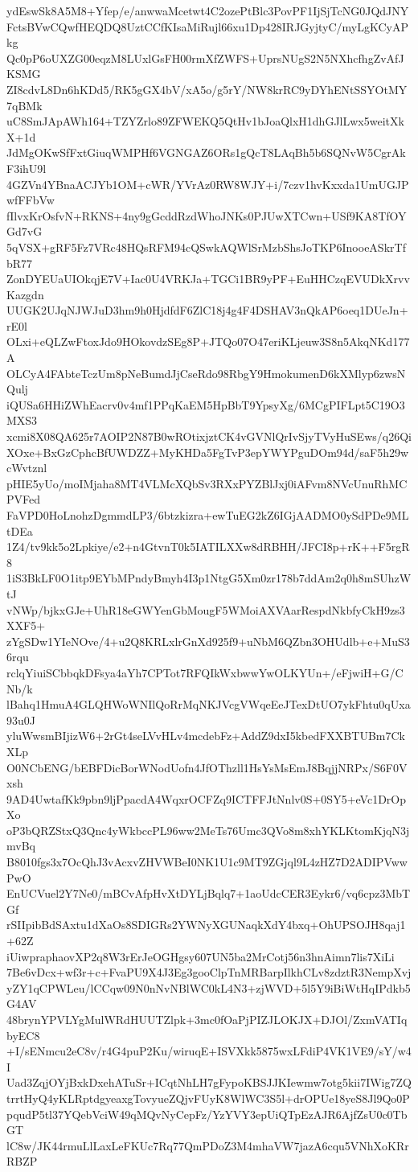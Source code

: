 ydEswSk8A5M8+Yfep/e/anwwaMcetwt4C2ozePtBlc3PovPF1IjSjTcNG0JQdJNY
FctsBVwCQwfHEQDQ8UztCCfKIsaMiRujl66xu1Dp428IRJGyjtyC/myLgKCyAPkg
Qc0pP6oUXZG00eqzM8LUxlGsFH00rmXfZWFS+UprsNUgS2N5NXhcfhgZvAfJKSMG
ZI8cdvL8Dn6hKDd5/RK5gGX4bV/xA5o/g5rY/NW8krRC9yDYhENtSSYOtMY7qBMk
uC8SmJApAWh164+TZYZrlo89ZFWEKQ5QtHv1bJoaQlxH1dhGJlLwx5weitXkX+1d
JdMgOKwSfFxtGiuqWMPHf6VGNGAZ6ORs1gQcT8LAqBh5b6SQNvW5CgrAkF3ihU9l
4GZVn4YBnaACJYb1OM+cWR/YVrAz0RW8WJY+i/7czv1hvKxxda1UmUGJPwfFFbVw
fIlvxKrOsfvN+RKNS+4ny9gGcddRzdWhoJNKs0PJUwXTCwn+USf9KA8TfOYGd7vG
5qVSX+gRF5Fz7VRc48HQsRFM94cQSwkAQWlSrMzbShsJoTKP6InooeASkrTfbR77
ZonDYEUaUIOkqjE7V+Iac0U4VRKJa+TGCi1BR9yPF+EuHHCzqEVUDkXrvvKazgdn
UUGK2UJqNJWJuD3hm9h0HjdfdF6ZlC18j4g4F4DSHAV3nQkAP6oeq1DUeJn+rE0l
OLxi+eQLZwFtoxJdo9HOkovdzSEg8P+JTQo07O47eriKLjeuw3S8n5AkqNKd177A
OLCyA4FAbteTczUm8pNeBumdJjCseRdo98RbgY9HmokumenD6kXMlyp6zwsNQulj
iQUSa6HHiZWhEacrv0v4mf1PPqKaEM5HpBbT9YpsyXg/6MCgPIFLpt5C19O3MXS3
xcmi8X08QA625r7AOIP2N87B0wROtixjztCK4vGVNlQrIvSjyTVyHuSEws/q26Qi
XOxe+BxGzCphcBfUWDZZ+MyKHDa5FgTvP3epYWYPguDOm94d/saF5h29wcWvtznl
pHIE5yUo/moIMjaha8MT4VLMcXQbSv3RXxPYZBlJxj0iAFvm8NVcUnuRhMCPVFed
FaVPD0HoLnohzDgmmdLP3/6btzkizra+ewTuEG2kZ6IGjAADMO0ySdPDe9MLtDEa
1Z4/tv9kk5o2Lpkiye/e2+n4GtvnT0k5IATILXXw8dRBHH/JFCI8p+rK++F5rgR8
1iS3BkLF0O1itp9EYbMPndyBmyh4I3p1NtgG5Xm0zr178b7ddAm2q0h8mSUhzWtJ
vNWp/bjkxGJe+UhR18eGWYenGbMougF5WMoiAXVAarRespdNkbfyCkH9zs3XXF5+
zYgSDw1YIeNOve/4+u2Q8KRLxlrGnXd925f9+uNbM6QZbn3OHUdlb+e+MuS36rqu
rclqYiuiSCbbqkDFsya4aYh7CPTot7RFQIkWxbwwYwOLKYUn+/eFjwiH+G/CNb/k
lBahq1HmuA4GLQHWoWNIlQoRrMqNKJVcgVWqeEeJTexDtUO7ykFhtu0qUxa93u0J
yluWwsmBIjizW6+2rGt4seLVvHLv4mcdebFz+AddZ9dxI5kbedFXXBTUBm7CkXLp
O0NCbENG/bEBFDicBorWNodUofn4JfOThzll1HsYsMsEmJ8BqjjNRPx/S6F0Vxsh
9AD4UwtafKk9pbn9ljPpacdA4WqxrOCFZq9ICTFFJtNnlv0S+0SY5+eVc1DrOpXo
oP3bQRZStxQ3Qnc4yWkbccPL96ww2MeTs76Umc3QVo8m8xhYKLKtomKjqN3jmvBq
B8010fgs3x7OcQhJ3vAcxvZHVWBeI0NK1U1c9MT9ZGjql9L4zHZ7D2ADIPVwwPwO
EnUCVuel2Y7Ne0/mBCvAfpHvXtDYLjBqlq7+1aoUdcCER3Eykr6/vq6cpz3MbTGf
rSIIpibBdSAxtu1dXaOs8SDIGRs2YWNyXGUNaqkXdY4bxq+OhUPSOJH8qaj1+62Z
iUiwpraphaovXP2q8W3rErJeOGHgsy607UN5ba2MrCotj56n3hnAimn7lis7XiLi
7Be6vDcx+wf3r+c+FvaPU9X4J3Eg3gooClpTnMRBarpIlkhCLv8zdztR3NempXvj
yZY1qCPWLeu/lCCqw09N0nNvNBlWC0kL4N3+zjWVD+5l5Y9iBiWtHqIPdkb5G4AV
48brynYPVLYgMulWRdHUUTZlpk+3mc0fOaPjPIZJLOKJX+DJOl/ZxmVATIqbyEC8
+I/sENmcu2eC8v/r4G4puP2Ku/wiruqE+ISVXkk5875wxLFdiP4VK1VE9/sY/w4I
Uad3ZqjOYjBxkDxehATuSr+ICqtNhLH7gFypoKBSJJKIewmw7otg5kii7IWig7ZQ
trrtHyQ4yKLRptdgyeaxgTovyueZQjvFUyK8WlWC3S5l+drOPUe18yeS8Jl9Qo0P
pqudP5tl37YQebVciW49qMQvNyCepFz/YzYVY3epUiQTpEzAJR6AjfZsU0c0TbGT
lC8w/JK44rmuLlLaxLeFKUc7Rq77QmPDoZ3M4mhaVW7jazA6cqu5VNhXoKRrRBZP
